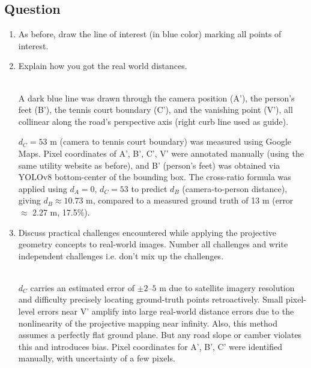 \subsection{Question}
\begin{enumerate}

\item As before, draw the line of interest (in blue color) marking all points of interest. 
  
\item Explain how you got the real world distances.
\begin{studentSpace}
    \\A dark blue line was drawn through the camera position (A'), the person's feet (B'), the tennis court boundary (C'), and the vanishing point (V'), all collinear along the road's perspective axis (right curb line used as guide).

    $d_C = 53$ m (camera to tennis court boundary) was measured using Google Maps. Pixel coordinates of A', B', C', V' were annotated manually (using the same utility website as before), and B' (person's feet) was obtained via YOLOv8 bottom-center of the bounding box. The cross-ratio formula was applied using $d_A=0$, $d_C=53$ to predict $d_B$ (camera-to-person distance), giving $d_B \approx 10.73$ m, compared to a measured ground truth of 13 m (error $\approx$ 2.27 m, 17.5\%).

\end{studentSpace}

  
\item Discuss practical challenges encountered while applying the projective
geometry concepts to real-world images. Number all challenges and write independent challenges i.e. don't mix up the challenges.
\begin{studentSpace}
    \\$d_C$ carries an estimated error of $\pm 2$--$5$ m due to satellite imagery resolution and difficulty precisely locating ground-truth points retroactively. Small pixel-level errors near V' amplify into large real-world distance errors due to the nonlinearity of the projective mapping near infinity. Also, this method assumes a perfectly flat ground plane. But any road slope or camber violates this and introduces bias. Pixel coordinates for A', B', C' were identified manually, with uncertainty of a few pixels.


\end{studentSpace}
\end{enumerate}
